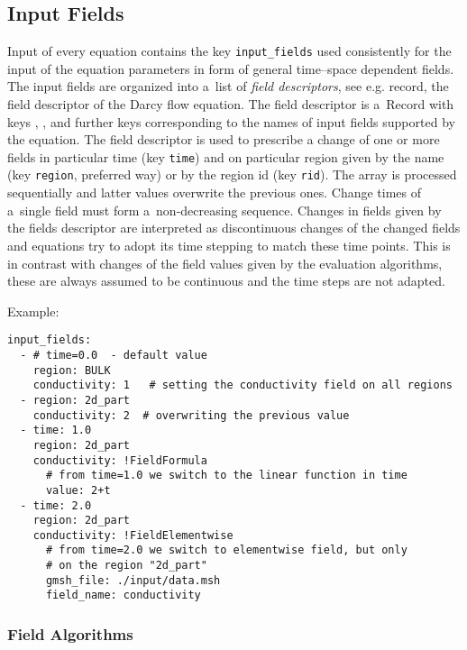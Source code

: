\subsection{Input Fields}
Input of every equation contains the key \verb'input_fields' used consistently for the input of the equation parameters 
in form of general time--space dependent fields.  The input fields are organized into a~list of {\it field descriptors}, see 
e.g.  record, the field descriptor of the Darcy flow equation.
The field descriptor is a~Record with keys 
, 
, 
and further keys corresponding to the 
names of input fields supported by the equation. The field descriptor is used to prescribe
a change of one or more fields in particular time (key \verb'time') and on particular region given  by the name (key \verb'region', preferred way) 
or by the region id (key \verb'rid'). 
The array is processed sequentially and latter values overwrite the previous ones. Change times of a~single field must form a~non-decreasing sequence.
Changes in fields given by the fields descriptor are interpreted as discontinuous changes of the changed fields
and equations try to adopt its time stepping to match these time points. This is in contrast with changes of the field values given by
the evaluation algorithms, these are always assumed to be continuous and the time steps are not adapted. 



Example:
\begin{verbatim}
input_fields:
  - # time=0.0  - default value
    region: BULK
    conductivity: 1   # setting the conductivity field on all regions
  - region: 2d_part
    conductivity: 2  # overwriting the previous value
  - time: 1.0
    region: 2d_part
    conductivity: !FieldFormula
      # from time=1.0 we switch to the linear function in time
      value: 2+t
  - time: 2.0
    region: 2d_part
    conductivity: !FieldElementwise
      # from time=2.0 we switch to elementwise field, but only
      # on the region "2d_part"
      gmsh_file: ./input/data.msh
      field_name: conductivity
\end{verbatim}


\subsubsection{Field Algorithms}
\label{sec:Fields}\hypertarget{sec:Fields}{}

